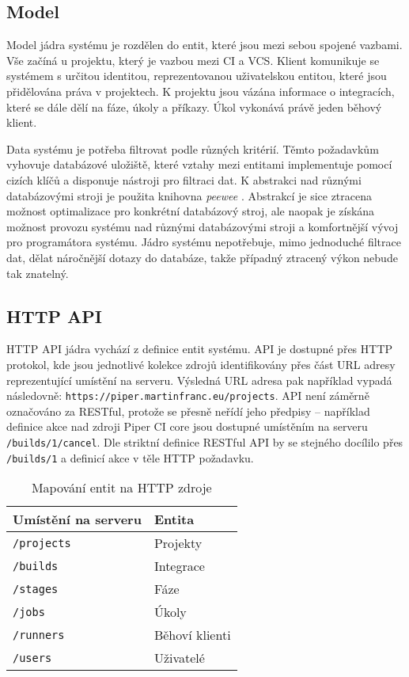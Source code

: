 \subsection{Model}

Model jádra systému je rozdělen do entit, které jsou mezi sebou spojené vazbami.
Vše začíná u projektu, který je vazbou mezi CI a VCS.
Klient komunikuje se systémem s určitou identitou, reprezentovanou uživatelskou entitou, které jsou přidělována práva v projektech.
K projektu jsou vázána informace o integracích, které se dále dělí na fáze, úkoly a příkazy.
Úkol vykonává právě jeden běhový klient.


Data systému je potřeba filtrovat podle různých kritérií.
Těmto požadavkům vyhovuje databázové uložiště, které vztahy mezi entitami implementuje pomocí cizích klíčů a disponuje nástroji pro filtraci dat.
K abstrakci nad různými databázovými stroji je použita knihovna \textit{peewee} \cite{peewee}.
Abstrakcí je sice ztracena možnost optimalizace pro konkrétní databázový stroj, ale naopak je získána možnost provozu systému nad různými databázovými stroji a komfortnější vývoj pro programátora systému.
Jádro systému nepotřebuje, mimo jednoduché filtrace dat, dělat náročnější dotazy do databáze, takže případný ztracený výkon nebude tak znatelný.

\subsection{HTTP API}

HTTP API jádra vychází z definice entit systému.
API je dostupné přes HTTP protokol, kde jsou jednotlivé kolekce zdrojů identifikovány přes část URL adresy reprezentující umístění na serveru.
Výsledná URL adresa pak například vypadá následovně: \verb|https://piper.martinfranc.eu/projects|.
API není záměrně označováno za RESTful, protože se přesně neřídí jeho předpisy -- například definice akce nad zdroji Piper CI core jsou dostupné umístěním na serveru \verb|/builds/1/cancel|.
Dle striktní definice RESTful API by se stejného docílilo přes \verb|/builds/1| a definicí akce v těle HTTP požadavku.

\begin{table}[ht]
\centering
\caption{Mapování entit na HTTP zdroje}
\begin{tabular}{|l|l|}
\hline
Umístění na serveru & Entita \\ \hline
\verb|/projects| & Projekty \\ \hline
\verb|/builds| & Integrace \\ \hline
\verb|/stages| & Fáze \\ \hline
\verb|/jobs| & Úkoly \\ \hline
\verb|/runners| & Běhoví klienti \\ \hline
\verb|/users| & Uživatelé \\ \hline
\end{tabular}
\end{table}

